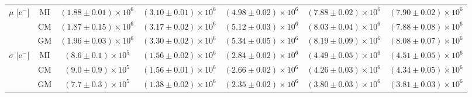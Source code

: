 \documentclass[11pt,a4paper]{article}
\begin{document}
\begin{table*}[b]
{\begin{tabular}{cc|ccccc}
\multirow{3}{*}{$\mu$ [$\textrm{e}^-$]} & MI & $(1.88 \pm 0.01) \times 10^6$ & $(3.10 \pm 0.01) \times 10^6$ & $(4.98 \pm 0.02) \times 10^6$ & $(7.88 \pm 0.02) \times 10^6$ & $(7.90 \pm 0.02) \times 10^6$ \\
                       & CM & $(1.87 \pm 0.15) \times 10^6$ & $(3.17 \pm 0.02) \times 10^6$ & $(5.12 \pm 0.03) \times 10^6$ & $(8.03 \pm 0.04) \times 10^6$ & $(7.88 \pm 0.08) \times 10^6$ \\
                       & GM & $(1.96 \pm 0.03) \times 10^6$ & $(3.30 \pm 0.02) \times 10^6$ & $(5.34 \pm 0.05) \times 10^6$ & $(8.19 \pm 0.09) \times 10^6$ & $(8.08 \pm 0.07) \times 10^6$ \\ \hline
                       
\multirow{3}{*}{$\sigma$ [$\textrm{e}^-$]} 
					   & MI & $(8.6 \pm 0.1) \times 10^5$ & $(1.56 \pm 0.02) \times 10^6$ & $(2.84 \pm 0.02) \times 10^6$ & $(4.49 \pm 0.05) \times 10^6$ & $(4.51 \pm 0.05) \times 10^6$ \\
                       & CM & $(9.0 \pm 0.9) \times 10^5$ & $(1.56 \pm 0.01) \times 10^6$ & $(2.66 \pm 0.02) \times 10^6$ & $(4.26 \pm 0.03) \times 10^6$ & $(4.34 \pm 0.05) \times 10^6$ \\
                       & GM & $(7.7 \pm 0.3) \times 10^5$ & $(1.38 \pm 0.02) \times 10^6$ & $(2.35 \pm 0.02) \times 10^6$ & $(3.80 \pm 0.03) \times 10^6$ & $(3.81 \pm 0.03) \times 10^6$ \\ \hline
                       

\end{tabular}}
\end{table*}
\end{document}
